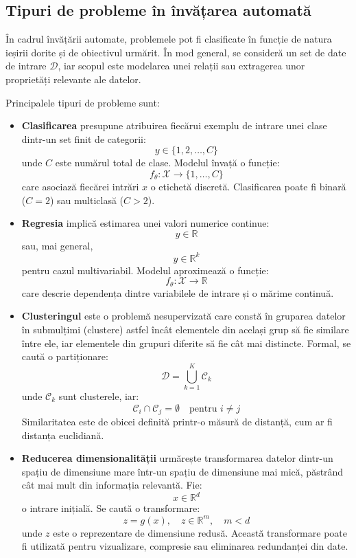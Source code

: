 \subsection*{Tipuri de probleme în învățarea automată}

În cadrul învățării automate, problemele pot fi clasificate în funcție de natura ieșirii dorite și de obiectivul urmărit. În mod general, se consideră un set de date de intrare \( \mathcal{D} \), iar scopul este modelarea unei relații sau extragerea unor proprietăți relevante ale datelor.

Principalele tipuri de probleme sunt:

\begin{itemize}
    \item \textbf{Clasificarea} presupune atribuirea fiecărui exemplu de intrare unei clase dintr-un set finit de categorii:
    \[
        y \in \{1, 2, \ldots, C\}
    \]
    unde \( C \) este numărul total de clase. Modelul învață o funcție:
    \[
        f_\theta : \mathcal{X} \rightarrow \{1, \ldots, C\}
    \]
    care asociază fiecărei intrări \( x \) o etichetă discretă. Clasificarea poate fi binară (\(C=2\)) sau multiclasă (\(C > 2\)).

    \item \textbf{Regresia} implică estimarea unei valori numerice continue:
    \[
        y \in \mathbb{R}
    \]
    sau, mai general,
    \[
        y \in \mathbb{R}^k
    \]
    pentru cazul multivariabil. Modelul aproximează o funcție:
    \[
        f_\theta : \mathcal{X} \rightarrow \mathbb{R}
    \]
    care descrie dependența dintre variabilele de intrare și o mărime continuă.

    \item \textbf{Clusteringul} este o problemă nesupervizată care constă în gruparea datelor în submulțimi (clustere) astfel încât elementele din același grup să fie similare între ele, iar elementele din grupuri diferite să fie cât mai distincte. Formal, se caută o partiționare:
    \[
        \mathcal{D} = \bigcup_{k=1}^{K} \mathcal{C}_k
    \]
    unde \( \mathcal{C}_k \) sunt clusterele, iar:
    \[
        \mathcal{C}_i \cap \mathcal{C}_j = \emptyset \quad \text{pentru } i \neq j
    \]
    Similaritatea este de obicei definită printr-o măsură de distanță, cum ar fi distanța euclidiană.

    \item \textbf{Reducerea dimensionalității} urmărește transformarea datelor dintr-un spațiu de dimensiune mare într-un spațiu de dimensiune mai mică, păstrând cât mai mult din informația relevantă. Fie:
    \[
        x \in \mathbb{R}^d
    \]
    o intrare inițială. Se caută o transformare:
    \[
        z = g(x), \quad z \in \mathbb{R}^m, \quad m < d
    \]
    unde \( z \) este o reprezentare de dimensiune redusă. Această transformare poate fi utilizată pentru vizualizare, compresie sau eliminarea redundanței din date.
\end{itemize}

